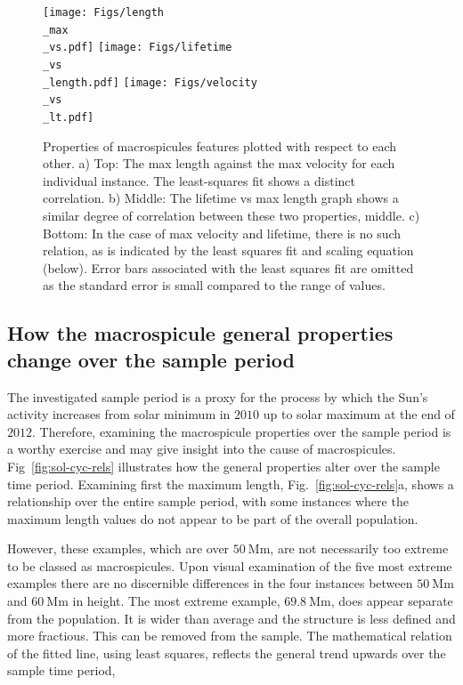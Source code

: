 \begin{figure}[h!]
	\centering
	\texttt{[image: Figs/length\\\_max\\\_vs.pdf]}
	\texttt{[image: Figs/lifetime\\\_vs\\\_length.pdf]}
	\texttt{[image: Figs/velocity\\\_vs\\\_lt.pdf]}
	\caption{\small Properties of macrospicules features plotted with respect to each other. a) Top: The max length against the max velocity for each individual instance. The least-squares fit shows a distinct correlation. b) Middle: The lifetime vs max length graph shows a similar degree of correlation between these two properties, middle. c) Bottom: In the case of max velocity and lifetime, there is no such relation, as is indicated by the least squares fit and scaling equation (below). Error bars associated with the least squares fit are omitted as the standard error is small compared to the range of values.}
	\label{fig:prop-rel}	
\end{figure}


\subsection{How the macrospicule general properties change over the sample period}
The investigated sample period is a proxy for the process by which the Sun's activity increases from solar minimum in $2010$ up to solar maximum at the end of $2012$. Therefore, examining the macrospicule properties over the sample period is a worthy exercise and may give insight into the cause of macrospicules. Fig~\ref{fig:sol-cyc-rels} illustrates how the general properties alter over the sample time period. Examining first the maximum length, Fig.~\ref{fig:sol-cyc-rels}a, shows a relationship over the entire sample period, with some instances where the maximum length values do not appear to be part of the overall population. 

However, these examples, which are over $50\ \textrm{Mm}$, are not necessarily too extreme to be classed as macrospicules. Upon visual examination of the five most extreme examples there are no discernible differences in the four instances between $50\ \textrm{Mm}$ and $60\ \textrm{Mm}$ in height. The most extreme example, $69.8\ \textrm{Mm}$, does appear separate from the population. It is wider than average and the structure is less defined and more fractious. This can be removed from the sample. The mathematical relation of the fitted line, using least squares, reflects the general trend upwards over the sample time period, 

